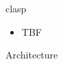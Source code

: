 \begin{frame}{clasp}
  \begin{itemize}
  \item <1-> TBF
  \end{itemize}
\end{frame}
\begin{frame}[c]{Architecture}

\end{frame}
%
